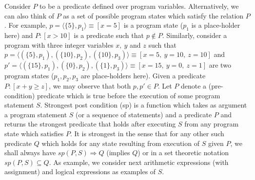 \documentclass[final,3p, review, times]{util/elsarticle}
\begin{document}
Consider $P$ to be a predicate defined over program variables. Alternatively, we can also think of $P$ as a set of possible program states which satisfy the relation $P$. For example, $p=\langle\{5\},p_1\rangle\equiv[x=5]$ is a program state ($p_1$ is a place-holder here) and $P:[x>10]$ is a predicate such that $p\notin P$. Similarly, consider a program with three integer variables $x,\ y$ and $z$ such that $p=\langle(\{5\},p_1),(\{10\},p_2),(\{10\},p_3)\rangle\equiv[x=5,\ y=10,\ z=10]$ and $p'=\langle(\{15\},p_1),(\{0\},p_2),(\{1\},p_3)\rangle\equiv[x=15,\ y=0,\ z=1]$ are two program states ($p_1,p_2,p_3$ are place-holders here). Given a predicate $P:[x+y\geq z]$, we may observe that both $p,p'\in P$. Let $P$ denote a (pre-condition) predicate which is true before the execution of some program statement $S$. Strongest post condition (sp) is a function which takes as argument a program statement $S$ (or a sequence of statements) and a predicate $P$ and returns the strongest predicate that holds after executing $S$ from any program state which satisfies $P$. It is strongest in the sense that for any other such predicate $Q$ which holds for any state resulting from execution of $S$ given $P$, we shall always have $sp(P,S)\Rightarrow Q$ (implies $Q$) or in a set theoretic notation $sp(P,S)\subseteq Q$. As example, we consider next arithmetic expressions (with assignment) and logical expressions as examples of $S$.
\end{document}

